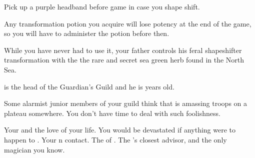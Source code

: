 \documentclass[char]{NeptuneBall}
\begin{document}
\begin{itemz}[Notes]
  \item Pick up a purple headband before game in case you shape shift.
  \item Any transformation potion you acquire will lose potency at the end of the game, so you will have to administer the potion before then.
\end{itemz}

\begin{itemz}[Trivia]
	\item While you have never had to use it, your father controls his feral shapeshifter transformation with the the rare and secret sea green herb found in the North Sea. 
  \item \cKratos{} is the head of the Guardian's Guild and he is \cKratos{\MYnumber} years old.
	\item Some alarmist junior members of your guild think that \pIndia{} is amassing troops on a plateau somewhere. You don't have time to deal with such foolishness.
\end{itemz}

\begin{contacts}
  \contact{\cQueen{}} Your \cQueen{\spouse} and the love of your life. You would be devastated if anything were to happen to \cQueen{\them}.
  \contact{\cSpy{}} Your \pPacifica{}n contact.
  \contact{\cKing{}} The \cKing{\King} of \pAtlantis{}.
  \contact{\cManta{}} The \cKing{\King}'s closest advisor, and the only magician you know.
\end{contacts}
\end{document}
